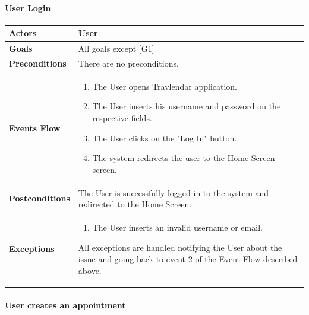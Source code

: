 \documentclass[12pt]{article}
\begin{document}
\paragraph{User Login}
\begin{center}
    \begin{tabular} { |p{}|p{}| }
        \hline
        \textbf{Actors} & User \\ 
        \hline
        \textbf{Goals} & All goals except {[G1]} \\ 
        \hline  
        \textbf{Preconditions} & There are no preconditions. \\ 
        \hline
        \textbf{Events Flow} & \begin{enumerate} 
                            \setlength{\itemsep}{0.5pt}
                            \item The User opens Travlendar application.
                            \item The User inserts his username and password on the respective fields.
                            \item The User clicks on the "Log In" button.
                            \item The system redirects the user to the Home Screen screen.
                            \end{enumerate} \\
        \hline
        \textbf{Postconditions} & The User is successfully logged in to the system and redirected to the Home Screen. \\
        \hline
        \textbf{Exceptions} & \begin{enumerate} 
                            \setlength{\itemsep}{0.5pt}
                            \item The User inserts an invalid username or email.
                            \end{enumerate} 
                            All exceptions are handled notifying the User about the issue and going back to event 2 of the Event Flow described above.\\ 
        \hline
    \end{tabular}
\end{center}


\paragraph{User creates an appointment}
\end{document}
